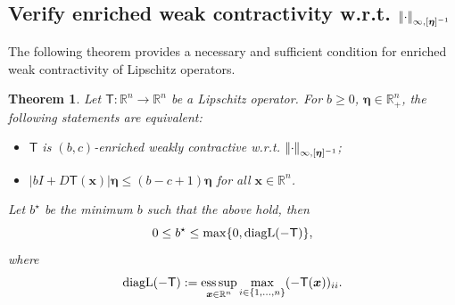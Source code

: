 \documentclass[journal,twoside,web]{ieeecolor}
\DeclareMathOperator*{\esup}{ess\,sup}
\newcommand{\abs}[1]{{\left\vert #1 \right\vert}}
\newcommand{\norm}[1]{{\left\vert\kern-0.25ex\left\vert #1\right\vert\kern-0.25ex\right\vert}}
\newcommand{\rea }{\mathbb{R}}
\newcommand{\xb}{\boldsymbol{x}}
\newcommand{\etab}{\boldsymbol{\eta}}
\newcommand{\Ts}{\mathsf{T}}
\newtheorem{thm}{Theorem}
\begin{document}
\subsection{Verify enriched weak contractivity w.r.t. $\norm{\cdot}_{\infty,[\etab]^{-1}}$}
%
The following theorem provides a necessary and sufficient condition for enriched weak contractivity of Lipschitz operators.
%
\begin{thm}\label{thm:inf-coenex}
%
Let $\Ts:\rea^n\rightarrow\rea^n$ be a Lipschitz operator.
%
For $b\geq 0$, $\etab\in\rea^n_+$, the following statements are equivalent:
%
\begin{itemize}
    \item[(i)] $\Ts$ is $(b,c)$-enriched weakly contractive w.r.t. $\norm{\cdot}_{\infty,[\etab]^{-1}}$;
    \item[(ii)] $\abs{b I + D\Ts(\xb)}\etab \leq (b-c+1)\etab$ for all $\xb\in\rea^n$.
\end{itemize}
%
Let $b^\star$ be the minimum $b$ such that the above hold, then
%
$$
0\leq b^\star \leq \max\{0,\normalfont{\text{diagL}(-\Ts)}\},
$$
%
where
%
\begin{equation}\label{eq:diagL}
\text{\textnormal{diagL}}(-\Ts):=\esup_{\xb\in\rea^n} \max_{i\in\{1,\ldots,n\}} (-\Ts(\xb))_{ii}.
\end{equation}
%
%
\end{thm}
%
\end{document}
